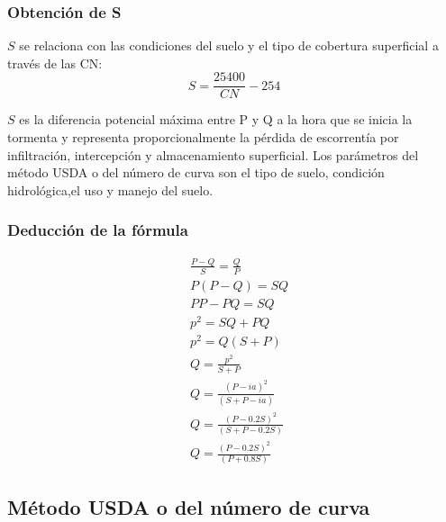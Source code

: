    \subsubsection{Obtención de S}
    $S$ se relaciona con las condiciones del suelo y el tipo de cobertura superficial a través de las CN:
    \begin{equation}
        S = \frac{25400}{CN}- 254
    \end{equation}
    
    $S$ es la diferencia potencial máxima entre P y Q a la hora que se inicia la tormenta y representa proporcionalmente la pérdida de escorrentía por infiltración, intercepción y almacenamiento superficial.
    Los parámetros del método USDA o del número de curva son el tipo de suelo, condición hidrológica,el uso y manejo del suelo.
    \subsubsection{Deducción de la fórmula}
    \begin{align*}
        &\frac{P-Q}{S}=\frac{Q}{P}\\
        &P(P-Q)=SQ\\
        &PP-PQ=SQ\\ 
        &p^2=SQ+PQ\\ 
        &p^2=Q(S+P)\\
        &Q=\frac{p^2}{S+P}\\
        &Q=\frac{(P-ia)^2}{(S+P-ia)}\\
        &Q=\frac{(P-0.2S)^2}{(S+P-0.2S)}\\
        &Q=\frac{(P-0.2S)^2}{(P+0.8S)}
    \end{align*}
    
    \subsection{Método USDA o del número de curva}
